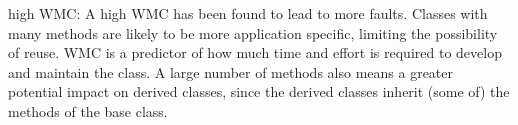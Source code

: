 {\begin{parts}
\begin{solution}[1.25in]
  high WMC: A high WMC has been found to lead to more faults. Classes
  with many methods are likely to be more application specific,
  limiting the possibility of reuse. WMC is a predictor of how much
  time and effort is required to develop and maintain the class. A
  large number of methods also means a greater potential impact on
  derived classes, since the derived classes inherit (some of) the
  methods of the base class.
  \end{solution}

\end{parts}
} %

